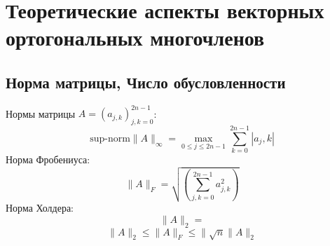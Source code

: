\chapter{Теоретические аспекты векторных ортогональных многочленов}
\section{Норма матрицы, Число обусловленности}

Нормы матрицы $A=(a_{j,k})_{j,k=0}^{2n-1}$:
\begin{equation}
\mbox{sup-norm} \parallel A \parallel_\infty={\max\limits_{0\leq j \leq 2n-1}} \sum\limits_{k=0}^{2n-1}{\left| a_j,k \right| }
\end{equation}
Норма Фробениуса:
\begin{equation}
\parallel A \parallel_F=\sqrt{\left( \sum\limits_{j,k=0}^{2n-1}{a_{j,k}^2}\right)}
\end{equation}
Норма Холдера:
\begin{equation}
\parallel A \parallel_2=
\end{equation}
\begin{equation}
\parallel A \parallel_2\leq \parallel A \parallel_F \leq \parallel \sqrt{n} \parallel A \parallel_2
\end{equation}

